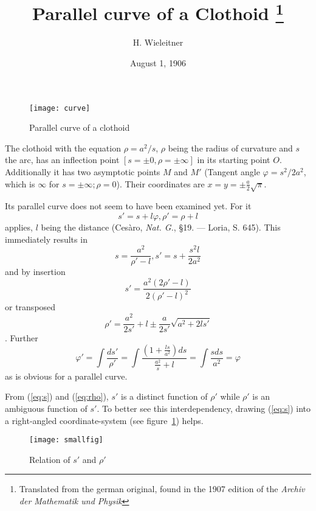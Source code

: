 \documentclass[12pt,a4paper]{scrartcl}
\title{Parallel curve of a Clothoid \thanks{Translated from the german original, found in the 1907 edition of the \emph{Archiv der Mathematik und Physik}}}
\author{H. Wieleitner}
\date{August 1, 1906}
\begin{document}
\maketitle
\begin{figure}
  \caption{Parallel curve of a clothoid}
  \centering
  \texttt{[image: curve]}
\end{figure}
The clothoid with the equation $\rho=a^2/s$, $\rho$ being the radius of curvature and $s$ the arc, has an inflection point $[s=\pm0, \rho=\pm\infty]$
in its starting point $O$.  Additionally it has two asymptotic points $M$ and $M'$ (Tangent angle $\varphi=s^2/2a^2$, which is $\infty$ for $s=\pm\infty;\rho=0$).
Their coordinates are $x=y=\pm\frac{a}{2}\sqrt{\pi}$.

Its parallel curve does not seem to have been examined yet.  For it
\begin{equation}
s'=s+l\varphi, \rho'=\rho+l
\end{equation}
applies, $l$ being the distance (Cesàro, \emph{Nat. G.}, §19. --- Loria, S. 645).
This immediately results in
\begin{displaymath}
s=\frac{a^2}{\rho'-l}, s'=s+\frac{s^2l}{2a^2}
\end{displaymath}
and by insertion
\begin{equation}
s'=\frac{a^2(2\rho'-l)}{2{(\rho'-l)}^2} \label{eq:s}
\end{equation}
or transposed
\begin{equation}
\rho'=\frac{a^2}{2s'}+l\pm\frac{a}{2s'}\sqrt{a^2+2ls'} \tag{2*}\label{eq:rho}
\end{equation}.  Further
\begin{equation}
\varphi'=\int{\frac{d s'}{\rho'}}=\int{\frac{\left(1+\frac{ls}{a^2}\right)d s}{\frac{a^2}{s}+l}}=\int{\frac{sds }{a^2}}=\varphi \label{eq:phi}
\end{equation}
as is obvious for a parallel curve.

From (\ref{eq:s}) and (\ref{eq:rho}), $s'$ is a distinct function of $\rho'$ while $\rho'$ is an ambiguous function of $s'$.
To better see this interdependency, drawing (\ref{eq:s}) into a right-angled coordinate-system (see figure~\ref{fig:small}) helps.

\begin{figure}
  \caption{Relation of $s'$ and $\rho'$}\label{fig:small}
  \centering
  \texttt{[image: smallfig]}
\end{figure}
\end{document}
